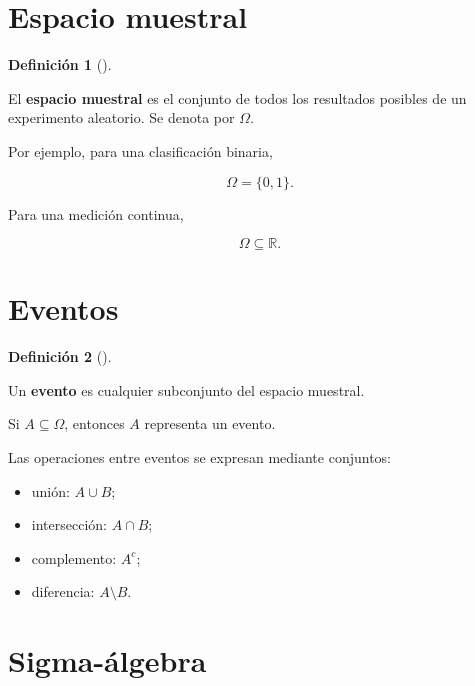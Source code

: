 \documentclass[
  spanish,
  11pt,
  letterpaper,
  DIV=11,
  numbers=noendperiod]{scrreprt}
\providecommand{\tightlist}{%
  \setlength{\itemsep}{0pt}\setlength{\parskip}{0pt}}
\theoremstyle{definition}
\newtheorem{definition}{Definición}[chapter]
\theoremstyle{plain}
\theoremstyle{definition}
\theoremstyle{remark}
\begin{document}
\section{Espacio muestral}\label{espacio-muestral}

\begin{definition}[]\protect\hypertarget{def-espacio-muestral}{}\label{def-espacio-muestral}

El \textbf{espacio muestral} es el conjunto de todos los resultados
posibles de un experimento aleatorio. Se denota por \(\Omega\).

\end{definition}

Por ejemplo, para una clasificación binaria,

\[
\Omega=\{0,1\}.
\]

Para una medición continua,

\[
\Omega\subseteq\mathbb{R}.
\]

\section{Eventos}\label{eventos}

\begin{definition}[]\protect\hypertarget{def-evento}{}\label{def-evento}

Un \textbf{evento} es cualquier subconjunto del espacio muestral.

\end{definition}

Si \(A\subseteq\Omega\), entonces \(A\) representa un evento.

Las operaciones entre eventos se expresan mediante conjuntos:

\begin{itemize}
\tightlist
\item
  unión: \(A\cup B\);
\item
  intersección: \(A\cap B\);
\item
  complemento: \(A^c\);
\item
  diferencia: \(A\setminus B\).
\end{itemize}

\section{Sigma-álgebra}\label{sigma-uxe1lgebra}
\end{document}
